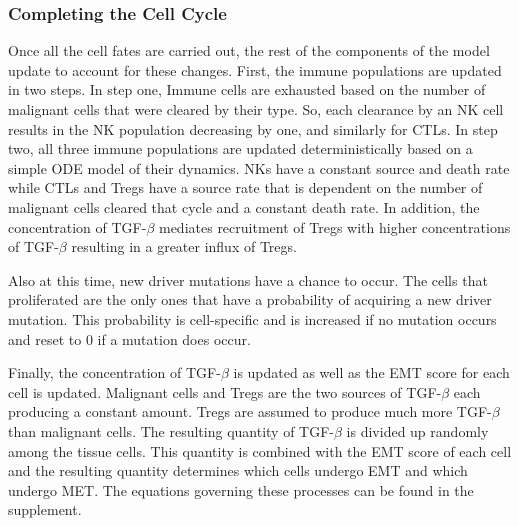 \documentclass[11pt]{article}
\begin{document}
\subsubsection{Completing the Cell Cycle}
Once all the cell fates are carried out, the rest of the components of the model update to account for these changes.
First, the immune populations are updated in two steps.
In step one, Immune cells are exhausted based on the number of malignant cells that were cleared by their type.
So, each clearance by an NK cell results in the NK population decreasing by one, and similarly for CTLs.
In step two, all three immune populations are updated deterministically based on a simple ODE model of their dynamics.
NKs have a constant source and death rate while CTLs and Tregs have a source rate that is dependent on the number of malignant cells cleared that cycle and a constant death rate.
In addition, the concentration of TGF-$\beta$ mediates recruitment of Tregs with higher concentrations of TGF-$\beta$ resulting in a greater influx of Tregs.
\par
Also at this time, new driver mutations have a chance to occur.
The cells that proliferated are the only ones that have a probability of acquiring a new driver mutation.
This probability is cell-specific and is increased if no mutation occurs and reset to 0 if a mutation does occur.
\par
Finally, the concentration of TGF-$\beta$ is updated as well as the EMT score for each cell is updated.
Malignant cells and Tregs are the two sources of TGF-$\beta$ each producing a constant amount.
Tregs are assumed to produce much more TGF-$\beta$ than malignant cells.
The resulting quantity of TGF-$\beta$ is divided up randomly among the tissue cells.
This quantity is combined with the EMT score of each cell and the resulting quantity determines which cells undergo EMT and which undergo MET.
The equations governing these processes can be found in the supplement.
\end{document}
